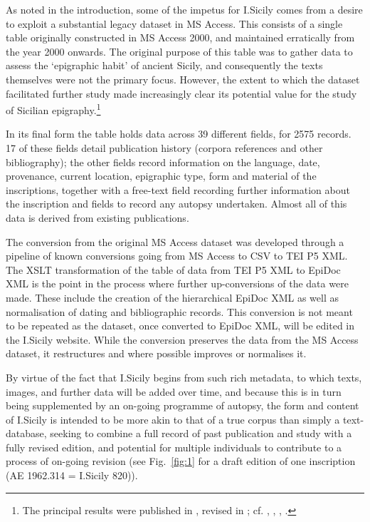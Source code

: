\documentclass[amsthm,ebook]{saparticle}
\begin{document}
As noted in the introduction, some of the impetus for I.Sicily comes from a desire to exploit a substantial legacy
dataset in MS Access. This consists of a single table originally constructed in MS Access 2000, and maintained
erratically from the year 2000 onwards. The original purpose of this table was to gather data to assess the `epigraphic
habit' of ancient Sicily, and consequently the texts themselves were not the primary focus. However, the extent to
which the dataset facilitated further study made increasingly clear its potential value for the study of Sicilian
epigraphy.\footnote{ The principal results were published in \citet{prag_epigraphy_2002}, revised in \citet[159-188]{prag_sicily_2004}; cf. \citet{prag_nouveau_2003}, \citet{prag_ciceronian_2007}, \citet{prag_sicilia_2008}, \citet{prag_sicilia_2010}.}

In its final form the table holds data across 39 different fields, for 2575 records. 17 of these fields detail
publication history (corpora references and other bibliography); the other fields record information on the language,
date, provenance, current location, epigraphic type, form and material of the inscriptions, together with a free-text
field recording further information about the inscription and fields to record any autopsy undertaken. Almost all of
this data is derived from existing publications.

The conversion from the original MS Access dataset was developed through a pipeline of known conversions going from MS
Access to CSV to TEI P5 XML. The XSLT transformation of the table of data from TEI P5 XML to EpiDoc XML is the point in
the process where further up-conversions of the data were made. These include the creation of the hierarchical EpiDoc
XML as well as normalisation of dating and bibliographic records. This conversion is not meant to be repeated as the
dataset, once converted to EpiDoc XML, will be edited in the I.Sicily website. While the conversion preserves the data
from the MS Access dataset, it restructures and where possible improves or normalises it.

By virtue of the fact that I.Sicily begins from such rich metadata, to which texts, images, and further data will be
added over time, and because this is in turn being supplemented by an on-going programme of autopsy, the form and
content of I.Sicily is intended to be more akin to that of a true corpus than simply a text-database, seeking to
combine a full record of past publication and study with a fully revised edition, and potential for multiple
individuals to contribute to a process of on-going revision (see Fig.~\ref{fig:1} for a draft edition of one inscription (AE
1962.314 = I.Sicily 820)).
\end{document}
